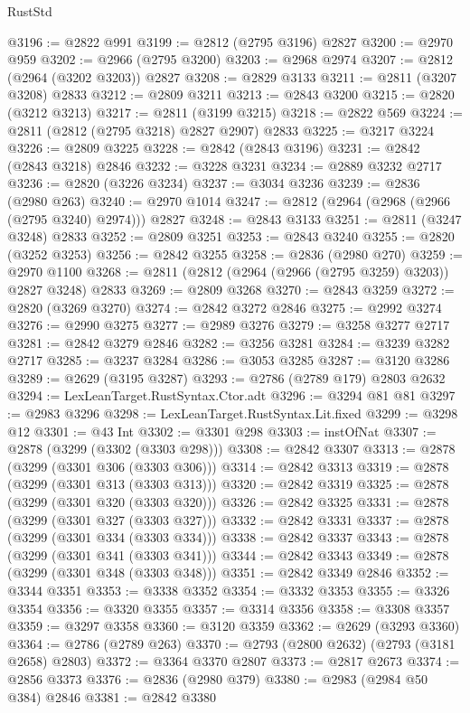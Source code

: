 \begin{lexlean}{RustStd}
\begin{coremodule}
@3196 := @2822 @991
@3199 := @2812 (@2795 @3196) @2827
@3200 := @2970 @959
@3202 := @2966 (@2795 @3200)
@3203 := @2968 @2974
@3207 := @2812 (@2964 (@3202 @3203)) @2827
@3208 := @2829 @3133
@3211 := @2811 (@3207 @3208) @2833
@3212 := @2809 @3211
@3213 := @2843 @3200
@3215 := @2820 (@3212 @3213)
@3217 := @2811 (@3199 @3215)
@3218 := @2822 @569
@3224 := @2811 (@2812 (@2795 @3218) @2827 @2907) @2833
@3225 := @3217 @3224
@3226 := @2809 @3225
@3228 := @2842 (@2843 @3196)
@3231 := @2842 (@2843 @3218) @2846
@3232 := @3228 @3231
@3234 := @2889 @3232 @2717
@3236 := @2820 (@3226 @3234)
@3237 := @3034 @3236
@3239 := @2836 (@2980 @263)
@3240 := @2970 @1014
@3247 := @2812 (@2964 (@2968 (@2966 (@2795 @3240) @2974))) @2827
@3248 := @2843 @3133
@3251 := @2811 (@3247 @3248) @2833
@3252 := @2809 @3251
@3253 := @2843 @3240
@3255 := @2820 (@3252 @3253)
@3256 := @2842 @3255
@3258 := @2836 (@2980 @270)
@3259 := @2970 @1100
@3268 := @2811 (@2812 (@2964 (@2966 (@2795 @3259) @3203)) @2827 @3248) @2833
@3269 := @2809 @3268
@3270 := @2843 @3259
@3272 := @2820 (@3269 @3270)
@3274 := @2842 @3272 @2846
@3275 := @2992 @3274
@3276 := @2990 @3275
@3277 := @2989 @3276
@3279 := @3258 @3277 @2717
@3281 := @2842 @3279 @2846
@3282 := @3256 @3281
@3284 := @3239 @3282 @2717
@3285 := @3237 @3284
@3286 := @3053 @3285
@3287 := @3120 @3286
@3289 := @2629 (@3195 @3287)
@3293 := @2786 (@2789 @179) @2803 @2632
@3294 := LexLeanTarget.RustSyntax.Ctor.adt
@3296 := @3294 @81 @81
@3297 := @2983 @3296
@3298 := LexLeanTarget.RustSyntax.Lit.fixed
@3299 := @3298 @12
@3301 := @43 Int
@3302 := @3301 @298
@3303 := instOfNat
@3307 := @2878 (@3299 (@3302 (@3303 @298)))
@3308 := @2842 @3307
@3313 := @2878 (@3299 (@3301 @306 (@3303 @306)))
@3314 := @2842 @3313
@3319 := @2878 (@3299 (@3301 @313 (@3303 @313)))
@3320 := @2842 @3319
@3325 := @2878 (@3299 (@3301 @320 (@3303 @320)))
@3326 := @2842 @3325
@3331 := @2878 (@3299 (@3301 @327 (@3303 @327)))
@3332 := @2842 @3331
@3337 := @2878 (@3299 (@3301 @334 (@3303 @334)))
@3338 := @2842 @3337
@3343 := @2878 (@3299 (@3301 @341 (@3303 @341)))
@3344 := @2842 @3343
@3349 := @2878 (@3299 (@3301 @348 (@3303 @348)))
@3351 := @2842 @3349 @2846
@3352 := @3344 @3351
@3353 := @3338 @3352
@3354 := @3332 @3353
@3355 := @3326 @3354
@3356 := @3320 @3355
@3357 := @3314 @3356
@3358 := @3308 @3357
@3359 := @3297 @3358
@3360 := @3120 @3359
@3362 := @2629 (@3293 @3360)
@3364 := @2786 (@2789 @263)
@3370 := @2793 (@2800 @2632) (@2793 (@3181 @2658) @2803)
@3372 := @3364 @3370 @2807
@3373 := @2817 @2673
@3374 := @2856 @3373
@3376 := @2836 (@2980 @379)
@3380 := @2983 (@2984 @50 @384) @2846
@3381 := @2842 @3380

\end{coremodule}
\end{lexlean}

